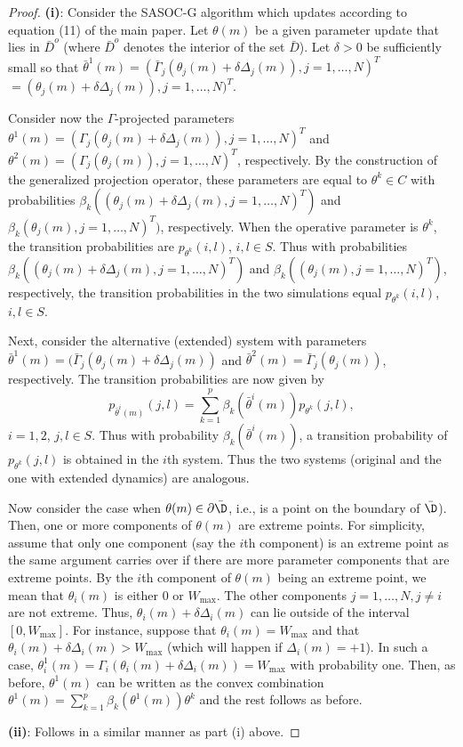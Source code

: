 \documentclass[11pt,letterpaper,english]{article}
\begin{document}
\begin{proof}
\textbf{(i)}:
Consider the SASOC-G algorithm which updates according to  equation (11) of the main paper. Let $\theta(m)$
be a given parameter update that lies in $\bar{D}^o$ (where $\bar{D}^o$ denotes
the interior of the set $\bar{D}$). Let $\delta>0$ be sufficiently small so that
$\bar{\theta}^1(m)=(\bar{\Gamma}_j(\theta_j(m)+\delta\Delta_j(m)),j=1,\ldots,N)^T$
$=(\theta_j(m)+\delta\Delta_j(m)),j=1,\ldots,N)^T$.

Consider now the $\Gamma$-projected parameters
$\theta^1(m) = (\Gamma_j(\theta_j(m)+\delta\Delta_j(m)),j=1,\ldots,N)^T$ and
$\theta^2(m) = (\Gamma_j(\theta_j(m)),j=1,\ldots,N)^T$, respectively.
By the construction of the generalized projection operator,
these parameters are equal to $\theta^k\in C$ with probabilities
$\beta_k((\theta_j(m)+\delta\Delta_j(m),j=1,\ldots,N)^T)$
and
$\beta_k(\theta_j(m),j=1,\ldots,N)^T)$, respectively.
When the operative parameter is $\theta^k$, the transition probabilities are
$p_{\theta^k}(i,l)$, $i,l\in S$. Thus with probabilities
$\beta_k((\theta_j(m)+\delta\Delta_j(m),j=1,\ldots,N)^T)$
and
$\beta_k((\theta_j(m),j=1,\ldots,N)^T)$, respectively,
the transition probabilities in the two simulations equal $p_{\theta^k}(i,l)$,
$i,l\in S$.

Next, consider the alternative (extended) system with parameters $\bar{\theta}^1(m) = (\bar\Gamma_j(\theta_j(m)+\delta\Delta_j(m))$
and $\bar{\theta}^2(m) = \bar\Gamma_j(\theta_j(m))$, respectively. The transition probabilities are now given by
\[p_{\bar{\theta}^i(m)}(j,l) = \sum_{k=1}^{p} \beta_k(\bar{\theta}^i(m))p_{\theta^k}(j,l),\]
$i=1,2$, $j,l\in S$. Thus with probability $\beta_k(\bar{\theta}^i(m))$, a transition
probability of $p_{\theta^k}(j,l)$ is obtained in the $i$th system.
Thus the two systems (original and the one with extended dynamics) are analogous.

Now consider the case
when $\theta(m)\in \partial\bar{\D}$, i.e., is a point on the boundary of $\bar{\D}$).
Then, one or more components of $\theta(m)$ are extreme points. For simplicity,
assume that only one component (say the $i$th component) is an extreme point as the
same argument carries over if there are more parameter components that are extreme
points. By
the $i$th component of $\theta(m)$ being an extreme
point, we mean that $\theta_i(m)$ is either $0$ or $W_{\max}$.
The other components $j=1,\ldots,N,j\not=i$ are not extreme.
Thus, $\theta_i(m)+\delta\Delta_i(m)$ can lie outside of the interval $[0,W_{\max}]$. For instance, suppose
that $\theta_i(m)=W_{\max}$ and that $\theta_i(m)+\delta\Delta_i(m)>W_{\max}$
(which will happen if $\Delta_i(m)=+1$). In such a case,
$\theta^1_i(m) = \Gamma_i(\theta_i(m)+\delta\Delta_i(m)) = W_{\max}$ with probability one.
Then, as before, $\theta^1(m)$ can be written as the convex combination
${\displaystyle \theta^1(m) = \sum_{k=1}^{p}\beta_k(\theta^1(m))
\theta^k}$ and
the rest follows as before.

\textbf{(ii)}: Follows in a similar manner as part (i) above. 
\end{proof}
\end{document}
